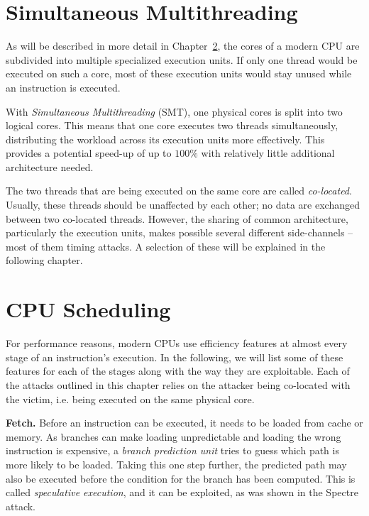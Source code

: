 \documentclass[11pt,
  titlepage=false,
]{scrreprt}
\begin{document}
\section{Simultaneous Multithreading}
\label{sec:smt}
As will be described in more detail in Chapter~\ref{sec:cpuschedulers},
the cores of a modern CPU are subdivided into multiple specialized execution units.
If only one thread would be executed on such a core,
most of these execution units would stay unused while an instruction is executed.

With \textit{Simultaneous Multithreading} (SMT), one physical cores is split into two logical cores.
This means that one core executes two threads simultaneously, distributing the workload across its execution units more effectively.
This provides a potential speed-up of up to $100\%$ with relatively little additional architecture needed.

The two threads that are being executed on the same core are called \textit{co-located}.
Usually, these threads should be unaffected by each other; no data are exchanged between two co-located threads.
However, the sharing of common architecture, particularly the execution units,
makes possible several different side-channels -- most of them timing attacks.
A selection of these will be explained in the following chapter.

\section{CPU Scheduling}
\label{sec:cpuschedulers}
For performance reasons, modern CPUs use efficiency features at almost every stage of an instruction's execution.
In the following, we will list some of these features for each of the stages along with the way they are exploitable.
Each of the attacks outlined in this chapter relies on the attacker being co-located with the victim,
i.e. being executed on the same physical core.

\textbf{Fetch.}
Before an instruction can be executed, it needs to be loaded from cache or memory.
As branches can make loading unpredictable and loading the wrong instruction is expensive, a \textit{branch prediction unit} tries to guess which path is more likely to be loaded.
Taking this one step further, the predicted path may also be executed before the condition for the branch has been computed.
This is called \textit{speculative execution}\cite{AMD2020OptimizationEPYC7002}, and it can be exploited, as was shown in the Spectre~\cite{spKocherHFGGHHLM019} attack.
\end{document}

